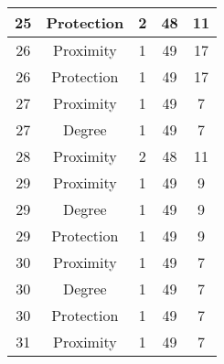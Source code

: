 \documentclass[results.tex]{subfiles}
\begin{document}
\begin{center}
\begin{tabular}{| c || c | c | c | c |}
            \hline
            25                      & Protection                   & 2                      & 48                      & 11                   \\
            \hline
            26                      & Proximity                    & 1                      & 49                      & 17                   \\
            \hline
            26                      & Protection                   & 1                      & 49                      & 17                   \\
            \hline
            27                      & Proximity                    & 1                      & 49                      & 7                    \\
            \hline
            27                      & Degree                       & 1                      & 49                      & 7                    \\
            \hline
            28                      & Proximity                    & 2                      & 48                      & 11                   \\
            \hline
            29                      & Proximity                    & 1                      & 49                      & 9                    \\
            \hline
            29                      & Degree                       & 1                      & 49                      & 9                    \\
            \hline
            29                      & Protection                   & 1                      & 49                      & 9                    \\
            \hline
            30                      & Proximity                    & 1                      & 49                      & 7                    \\
            \hline
            30                      & Degree                       & 1                      & 49                      & 7                    \\
            \hline
            30                      & Protection                   & 1                      & 49                      & 7                    \\
            \hline
            31                      & Proximity                    & 1                      & 49                      & 7                    \\

\end{tabular}
\end{center}
\end{document}
